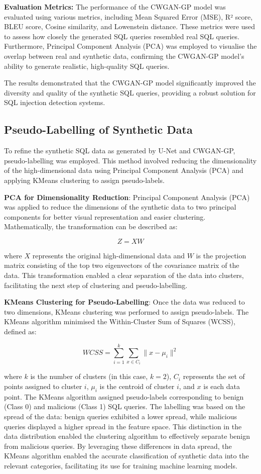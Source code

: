 \documentclass[journal]{IEEEtran}
\begin{document}
\textbf{Evaluation Metrics:} The performance of the CWGAN-GP model was evaluated using various metrics, including Mean Squared Error (MSE), R² score, BLEU score, Cosine similarity, and Lowenstein distance. These metrics were used to assess how closely the generated SQL queries resembled real SQL queries. Furthermore, Principal Component Analysis (PCA) was employed to visualise the overlap between real and synthetic data, confirming the CWGAN-GP model’s ability to generate realistic, high-quality SQL queries.

The results demonstrated that the CWGAN-GP model significantly improved the diversity and quality of the synthetic SQL queries, providing a robust solution for SQL injection detection systems.

\subsection{Pseudo-Labelling of Synthetic Data}
To refine the synthetic SQL data as generated by U-Net and CWGAN-GP, pseudo-labelling was employed. This method involved reducing the dimensionality of the high-dimensional data using Principal Component Analysis (PCA) and applying KMeans clustering to assign pseudo-labels.

\textbf{PCA for Dimensionality Reduction}: Principal Component Analysis (PCA) was applied to reduce the dimensions of the synthetic data to two principal components for better visual representation and easier clustering. Mathematically, the transformation can be described as:

\[
Z = XW
\]

where \( X \) represents the original high-dimensional data and \( W \) is the projection matrix consisting of the top two eigenvectors of the covariance matrix of the data. This transformation enabled a clear separation of the data into clusters, facilitating the next step of clustering and pseudo-labelling.

\textbf{KMeans Clustering for Pseudo-Labelling}: Once the data was reduced to two dimensions, KMeans clustering was performed to assign pseudo-labels. The KMeans algorithm minimised the Within-Cluster Sum of Squares (WCSS), defined as:

\[
WCSS = \sum_{i=1}^{k} \sum_{x \in C_i} \lVert x - \mu_i \rVert^2
\]

where \( k \) is the number of clusters (in this case, \( k=2 \)), \( C_i \) represents the set of points assigned to cluster \( i \), \( \mu_i \) is the centroid of cluster \( i \), and \( x \) is each data point. The KMeans algorithm assigned pseudo-labels corresponding to benign (Class 0) and malicious (Class 1) SQL queries. The labelling was based on the spread of the data: benign queries exhibited a lower spread, while malicious queries displayed a higher spread in the feature space. This distinction in the data distribution enabled the clustering algorithm to effectively separate benign from malicious queries. By leveraging these differences in data spread, the KMeans algorithm enabled the accurate classification of synthetic data into the relevant categories, facilitating its use for training machine learning models.
\end{document}

